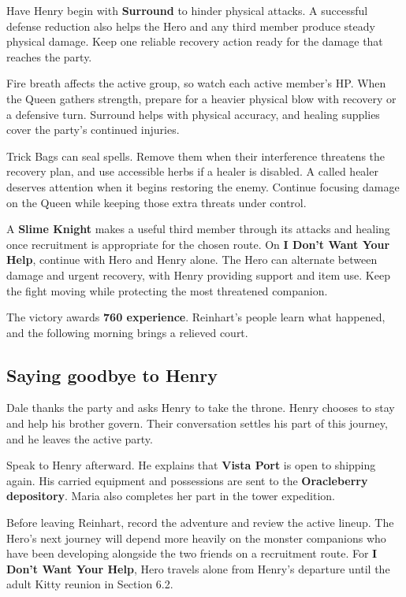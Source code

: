 Have Henry begin with \textbf{Surround} to hinder physical attacks.
A successful defense reduction also helps the Hero and any third member
produce steady physical damage. Keep one reliable recovery action ready
for the damage that reaches the party.

Fire breath affects the active group, so watch each active member's HP.
When the Queen gathers strength, prepare for a heavier physical blow
with recovery or a defensive turn. Surround helps with physical accuracy,
and healing supplies cover the party's continued injuries.

Trick Bags can seal spells. Remove them when their interference threatens
the recovery plan, and use accessible herbs if a healer is disabled.
A called healer deserves attention when it begins restoring the enemy.
Continue focusing damage on the Queen while keeping those extra threats
under control.

A \textbf{Slime Knight} makes a useful third member through its attacks
and healing once recruitment is appropriate for the chosen route. On
\textbf{I Don't Want Your Help}, continue with Hero and Henry alone.
The Hero can alternate between damage and urgent recovery,
with Henry providing support and item use. Keep the fight moving while
protecting the most threatened companion.

The victory awards \textbf{760 experience}. Reinhart's people learn
what happened, and the following morning brings a relieved court.


\subsection*{Saying goodbye to Henry}

Dale thanks the party and asks Henry to take the throne. Henry chooses
to stay and help his brother govern. Their conversation settles his part
of this journey, and he leaves the active party.

Speak to Henry afterward. He explains that \textbf{Vista Port} is
open to shipping again. His carried equipment and possessions are sent
to the \textbf{Oracleberry depository}. Maria also completes her part
in the tower expedition.

Before leaving Reinhart, record the adventure and review the active
lineup. The Hero's next journey will depend more heavily on the monster
companions who have been developing alongside the two friends on a
recruitment route. For \textbf{I Don't Want Your Help}, Hero travels
alone from Henry's departure until the adult Kitty reunion in Section 6.2.

